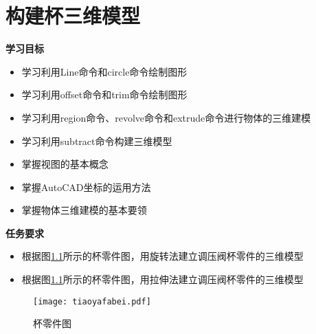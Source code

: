 \chapter{构建杯三维模型}\label{chap:bei}

{\bfseries 学习目标}
\begin{itemize}
\item 学习利用Line命令和circle命令绘制图形
\item 学习利用offset命令和trim命令绘制图形
\item 学习利用region命令、revolve命令和extrude命令进行物体的三维建模
\item 学习利用subtract命令构建三维模型
\item 掌握视图的基本概念
\item 掌握AutoCAD坐标的运用方法
\item 掌握物体三维建模的基本要领
\end{itemize}

{\bfseries 任务要求}
\begin{itemize}
\item 根据图\ref{fig:tiaoyafabei}所示的杯零件图，用旋转法建立调压阀杯零件的三维模型
\item 根据图\ref{fig:tiaoyafabei}所示的杯零件图，用拉伸法建立调压阀杯零件的三维模型
\end{itemize}

\noindent
\begin{figure}[htbp]
\centering
\texttt{[image: tiaoyafabei.pdf]}
\caption{杯零件图}\label{fig:tiaoyafabei}
\end{figure}
\endinput